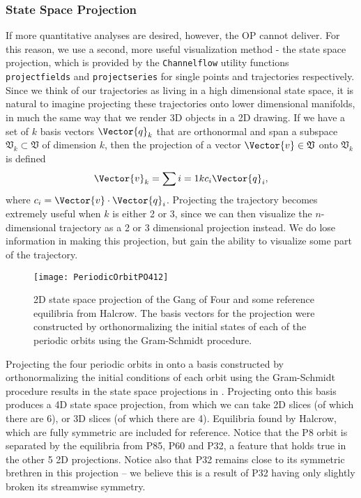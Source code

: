 \subsubsection{State Space Projection}
If more quantitative analyses are desired, however, the OP cannot deliver. For this reason, we use a second, more useful visualization method - the state space projection, which is provided by the {\tt Channelflow} utility functions {\tt projectfields} and {\tt projectseries} for single points and trajectories respectively. Since we think of our trajectories as living in a high dimensional state space, it is natural to imagine projecting these trajectories onto lower dimensional manifolds, in much the same way that we render 3D objects in a 2D drawing. If we have a set of $k$ basis vectors $\Vector{q}_k$ that are orthonormal and span a subspace $\mathfrak{V}_k \subset \mathfrak{V}$ of dimension $k$, then the projection of a vector $\Vector{v} \in \mathfrak{V}$ onto $\mathfrak{V}_k$ is defined 
\begin{equation}
\Vector{v}_k = \sum{i = 1}{k}{c_i \Vector{q}_i},
\end{equation}
where $c_i = \Vector{v} \cdot \Vector{q}_i$. Projecting the trajectory becomes extremely useful when $k$ is either 2 or 3, since we can then visualize the $n$-dimensional trajectory as a 2 or 3 dimensional projection instead. We do lose information in making this projection, but gain the ability to visualize some part of the trajectory. \\
\begin{figure}[h]
\texttt{[image: PeriodicOrbitPO412]}
\caption{2D state space projection of the Gang of Four and some reference equilibria from Halcrow. The basis vectors for the projection were constructed by orthonormalizing the initial states of each of the periodic orbits using the Gram-Schmidt procedure.}\label{fig:POStateSpace}
\end{figure}
\clearpage Projecting the four periodic orbits in  onto a basis constructed by orthonormalizing the initial conditions of each orbit using the Gram-Schmidt procedure results in the state space projections in . Projecting onto this basis produces a 4D state space projection, from which we can take 2D slices (of which there are 6), or 3D slices (of which there are 4). Equilibria found by Halcrow, which are fully symmetric are included for reference.  Notice that the P8 orbit is separated by the equilibria from P85, P60 and P32, a feature that holds true in the other 5 2D projections. Notice also that P32 remains close to its symmetric brethren in this projection -- we believe this is a result of P32 having only slightly broken its streamwise symmetry. \\

